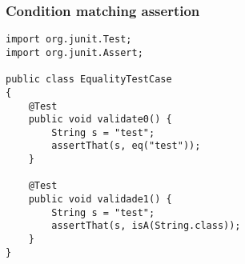 \begin{frame}[fragile, hasprev=false, hasnext=false]
\frametitle{Condition matching assertion}
\label{example:junit-condition-matching-assertion}

\begin{lstlisting}
import org.junit.Test;
import org.junit.Assert;

public class EqualityTestCase
{
	@Test
	public void validate0() {
		String s = "test";
		assertThat(s, eq("test"));
	}

	@Test
	public void validade1() {
		String s = "test";
		assertThat(s, isA(String.class));
	}
}
\end{lstlisting}
\end{frame}